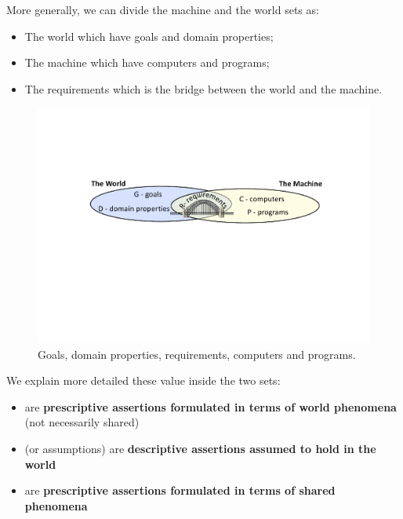 \noindent
More generally, we can divide the machine and the world sets as:
\begin{itemize}
    \item The world which have goals and domain properties;
    \item The machine which have computers and programs;
    \item The requirements which is the bridge between the world and the machine.
\end{itemize}

\begin{figure}[!htp]
    \centering
    \includegraphics[width=\textwidth]{img/world-and-machine-2.pdf}
    \caption{Goals, domain properties, requirements, computers and programs.}
\end{figure}

\noindent
We explain more detailed these value inside the two sets:
\begin{itemize}
    \item {} are \textbf{prescriptive assertions formulated in terms of world phenomena} (not necessarily shared)
    \item {} (or assumptions) are \textbf{descriptive assertions assumed to hold in the world}
    \item {} are \textbf{prescriptive assertions formulated in terms of shared phenomena} 
\end{itemize}

\newpage

